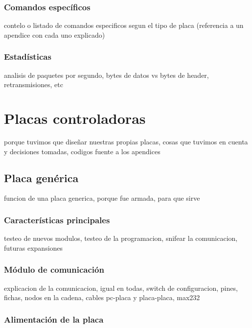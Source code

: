 \subsubsection{Comandos espec\'ificos}
\label{}

contelo o listado de comandos especificos segun el tipo de placa (referencia a un apendice con cada uno explicado)

\subsubsection{Estad\'isticas}
\label{}

analisis de paquetes por segundo, bytes de datos vs bytes de header, retransmisiones, etc

\section{Placas controladoras}
\label{}

porque tuvimos que diseñar nuestras propias placas, cosas que tuvimos en cuenta y decisiones tomadas, codigos fuente a los apendices

\subsection{Placa gen\'erica}
\label{}

funcion de una placa generica, porque fue armada, para que sirve

\subsubsection{Caracter\'isticas principales}
\label{}

testeo de nuevos modulos, testeo de la programacion, snifear la comunicacion, futuras expansiones

\subsubsection{M\'odulo de comunicaci\'on}
\label{}

explicacion de la comunicacion, igual en todas, switch de configuracion, pines, fichas, nodos en la cadena, cables pc-placa y placa-placa, max232

\subsubsection{Alimentaci\'on de la placa}
\label{}

